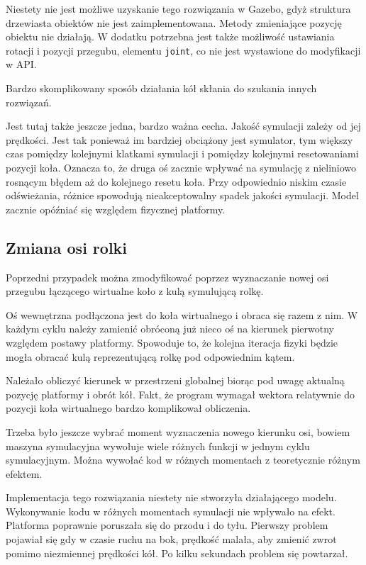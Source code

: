 		Niestety nie jest możliwe uzyskanie tego rozwiązania w Gazebo, gdyż struktura drzewiasta obiektów nie jest zaimplementowana.
		Metody zmieniające pozycję obiektu nie działają.
		W dodatku potrzebna jest także możliwość ustawiania rotacji i pozycji przegubu, elementu \texttt{joint}, co nie jest wystawione do modyfikacji w API.

		Bardzo skomplikowany sposób działania kół skłania do szukania innych rozwiązań.

		Jest tutaj także jeszcze jedna, bardzo ważna cecha. Jakość symulacji zależy od jej prędkości.
		Jest tak ponieważ im bardziej obciążony jest symulator, tym większy czas pomiędzy kolejnymi klatkami symulacji i pomiędzy kolejnymi resetowaniami pozycji koła.
		Oznacza to, że druga oś zacznie wpływać na symulację z nieliniowo rosnącym błędem aż do kolejnego resetu koła.
		Przy odpowiednio niskim czasie odświeżania, różnice spowodują nieakceptowalny spadek jakości symulacji.
		Model zacznie opóźniać się względem fizycznej platformy.

	\subsection{Zmiana osi rolki}
		Poprzedni przypadek można zmodyfikować poprzez wyznaczanie nowej osi przegubu łączącego wirtualne koło z kulą symulującą rolkę.

		Oś wewnętrzna podłączona jest do koła wirtualnego i obraca się razem z nim.
		W każdym cyklu należy zamienić obróconą już nieco oś na kierunek pierwotny względem postawy platformy.
		Spowoduje to, że kolejna iteracja fizyki będzie mogła obracać kulą reprezentującą rolkę pod odpowiednim kątem.

		Należało obliczyć kierunek w przestrzeni globalnej biorąc pod uwagę aktualną pozycję platformy i obrót kół.
		Fakt, że program wymagał wektora relatywnie do pozycji koła wirtualnego bardzo komplikował obliczenia.

		Trzeba było jeszcze wybrać moment wyznaczenia nowego kierunku osi, bowiem maszyna symulacyjna wywołuje wiele różnych funkcji w jednym cyklu symulacyjnym.
		Można wywołać kod w różnych momentach z teoretycznie różnym efektem. 

		Implementacja tego rozwiązania niestety nie stworzyła działającego modelu.
		Wykonywanie kodu w różnych momentach symulacji nie wpływało na efekt.
		Platforma poprawnie poruszała się do przodu i do tyłu. 
		Pierwszy problem pojawiał się gdy w czasie ruchu na bok, prędkość malała, aby zmienić zwrot pomimo niezmiennej prędkości kół.
		Po kilku sekundach problem się powtarzał.

